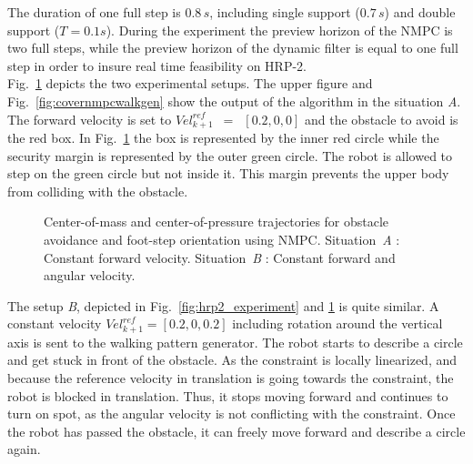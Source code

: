 The duration of one full step is $0.8\,s$, including single support ($0.7\,s$) and double support ($T=0.1s$).
During the experiment the preview horizon of the NMPC is two full steps, while the preview horizon of the dynamic filter is equal to one full step 
in order to insure real time feasibility on \mbox{HRP-2}.\\
Fig.~\ref{fig:trajectories} depicts the two experimental setups.
The upper figure and Fig.~\ref{fig:covernmpcwalkgen} show the output of the algorithm in the situation \emph{A}.
The forward velocity is set to ${Vel}_{k+1}^{ref}$~$=$~$[0.2,0,0]$ and the obstacle to avoid is the red box.
In Fig.~\ref{fig:trajectories} the box is represented by the inner red circle while the security margin is represented by the outer green circle.
The robot is allowed to step on the green circle but not inside it.
This margin prevents the upper body from colliding with the obstacle.
\begin{figure}[h]
  \begin{center}
  \caption[Test cases \emph{A} and \emph{B}]
  {
  Center-of-mass and center-of-pressure trajectories
  for obstacle avoidance and foot-step orientation using NMPC.
  Situation~\emph{A} : Constant forward velocity.
  Situation~\emph{B} : Constant forward and angular velocity.
  }
  \label{fig:trajectories}
  \end{center}
\end{figure}

The setup \emph{B}, depicted in Fig.~\ref{fig:hrp2_experiment} and \ref{fig:trajectories} is quite similar.
A constant velocity ${Vel}_{k+1}^{ref}=[0.2,0,0.2]$ including rotation around the vertical axis is sent to the walking pattern generator.
The robot starts to describe a circle and get stuck in front of the obstacle.
As the constraint is locally linearized, and because the reference velocity in translation is going towards the constraint,
the robot is blocked in translation.
Thus, it stops moving forward and continues to turn on spot, as the angular velocity is not conflicting with the constraint.
Once the robot has passed the obstacle, it can freely move forward and describe a circle again.

